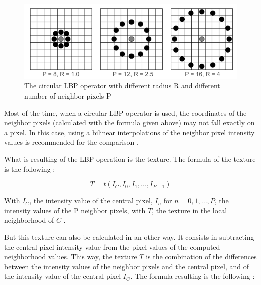 \begin{figure}[!h]
\begin{center}
\noindent \includegraphics[scale=0.5]{figures/lbp_circular_operator} 
\newline
\caption{The circular LBP operator with different radius R and different number of neighbor pixels P}
\label{lbp_circular_operator}
\end{center} 
\end{figure}

\noindent Most of the time, when a circular LBP operator is used, the coordinates of the neighbor pixels (calculated with the formula given above) may not fall exactly on a pixel. In this case, using a bilinear interpolations of the neighbor pixel intensity values is recommended for the comparison \cite{GAN08}.
\newline

\noindent What is resulting of the LBP operation is the texture. The formula of the texture is the following \cite{GAN08}:
\newline

\begin{equation}
   T = t(I_C, I_0, I_1, ..., I_{P-1})
\end{equation}

\vspace{\baselineskip}
\noindent With $ I_C $, the intensity value of the central pixel, $ I_n $ for $ n = 0, 1, ..., P $, the intensity values of the P neighbor pixels, with $ T $, the texture in the local neighborhood of $ C $ \cite{GAN08}.
\newline

\noindent But this texture can also be calculated in an other way. It consists in subtracting the central pixel intensity value from the pixel values of the computed neighborhood values. This way, the texture $ T $ is the combination of the differences between the intensity values of the neighbor pixels and the central pixel, and of the intensity value of the central pixel $ I_C $. The formula resulting is the following \cite{GAN08}:
\newline

